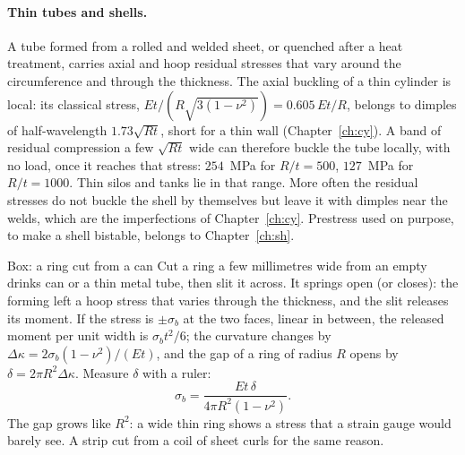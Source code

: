 \paragraph{Thin tubes and shells.}
A tube formed from a rolled and welded sheet, or quenched after a heat treatment, carries axial and hoop
residual stresses that vary around the circumference and through the thickness. The axial buckling of a
thin cylinder is local: its classical stress, $E t/(R\sqrt{3(1-\nu^2)}) = 0.605\,Et/R$, belongs to dimples
of half-wavelength $1.73\sqrt{Rt}$, short for a thin wall (Chapter~\ref{ch:cy}). A band of residual
compression a few $\sqrt{Rt}$ wide can therefore buckle the tube locally, with no load, once it reaches
that stress: $254$~MPa for $R/t = 500$, $127$~MPa for $R/t = 1000$. Thin silos and tanks lie in that range.
More often the residual stresses do not buckle the shell by themselves but leave it with dimples near the
welds, which are the imperfections of Chapter~\ref{ch:cy}. Prestress used on purpose, to make a shell bistable,
belongs to Chapter~\ref{ch:sh}.

\begin{gbox}{Box: a ring cut from a can}\label{sec:tw-ring}
%
Cut a ring a few millimetres wide from an empty drinks can or a thin metal tube, then slit it across. It
springs open (or closes): the forming left a hoop stress that varies through the thickness, and the slit
releases its moment. If the stress is $\pm\sigma_b$ at the two faces, linear in between, the released moment per
unit width is $\sigma_bt^2/6$; the curvature changes by $\Delta\kappa = 2\sigma_b(1 - \nu^2)/(Et)$, and the gap of a ring of
radius $R$ opens by $\delta = 2\pi R^2\Delta\kappa$. Measure $\delta$ with a ruler:
\[
  \sigma_b = \frac{Et\,\delta}{4\pi R^2(1 - \nu^2)} .
\]
The gap grows like $R^2$: a wide thin ring shows a stress that a strain gauge would barely see. A strip cut
from a coil of sheet curls for the same reason.
\end{gbox}

